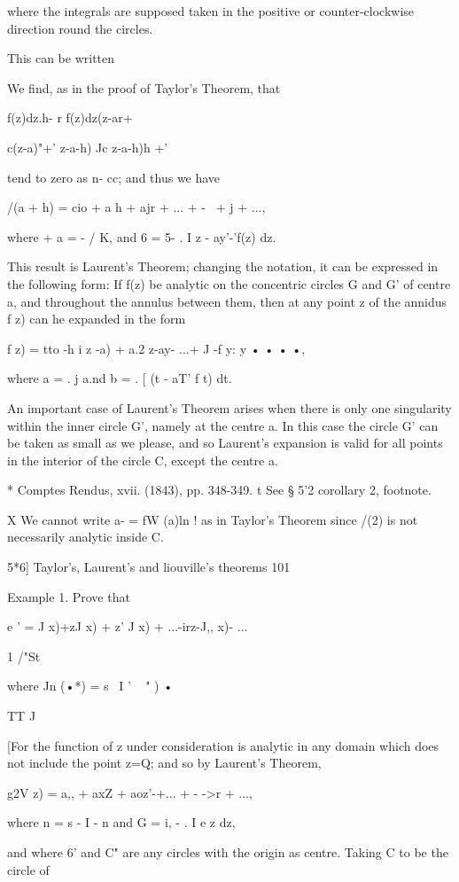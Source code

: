 {{where the integrals are supposed taken in the positive or
counter-clockwise direction round the circles.

This can be written

We find, as in the proof of Taylor's Theorem, that

f(z)dz.h- r f(z)dz(z-ar+

c(z-a)"+' z-a-h) Jc z-a-h)h +'

tend to zero as n- cc; and thus we have

/(a + h) = cio + a h + ajr + ... + -~ + j + ...,

where + a = - / K, and 6 = 5- . I z - ay'-'f(z) dz.

This result is Laurent's Theorem; changing the notation, it can be
expressed in the following form: If f(z) be analytic on the concentric
circles G and G' of centre a, and throughout the annulus between them,
then at any point z of the annidus f z) can he expanded in the form

f z) = tto -h i z -a) + a.2 z-ay- ...+ J -f y: y • • • •,

where a = . j a.nd b = . [ (t - aT' f t) dt.

An important case of Laurent's Theorem arises when there is only one
singularity within the inner circle G', namely at the centre a. In
this case the circle G' can be taken as small as we please, and so
Laurent's expansion is valid for all points in the interior of the
circle C, except the centre a.

* Comptes Rendus, xvii. (1843), pp. 348-349. t See § 5'2 corollary 2,
footnote.

X We cannot write a- = fW (a)ln ! as in Taylor's Theorem since /(2) is
not necessarily analytic inside C.

5*6] Taylor's, Laurent's and liouville's theorems 101

Example 1. Prove that

e ' = J x)+zJ x) + z' J x) + ...-irz-J,, x)- ...

1 /"St

where Jn (•*) = s~ I ' ~ " ) •

 TT J

[For the function of z under consideration is analytic in any domain
which does not include the point z=Q; and so by Laurent's Theorem,

g2V z) = a,, + axZ + aoz'-+... + - ->r + ...,

where n = s - I - n and G = i, - . I e z dz,

and where 6' and C" are any circles with the origin as centre. Taking
C to be the circle of

}}
